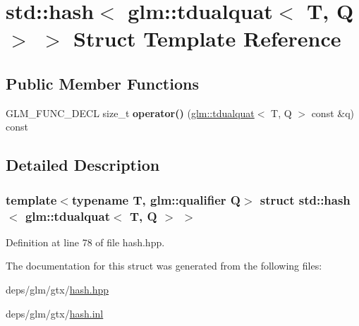 \hypertarget{structstd_1_1hash_3_01glm_1_1tdualquat_3_01T_00_01Q_01_4_01_4}{}\section{std\+:\+:hash$<$ glm\+:\+:tdualquat$<$ T, Q $>$ $>$ Struct Template Reference}
\label{structstd_1_1hash_3_01glm_1_1tdualquat_3_01T_00_01Q_01_4_01_4}
\subsection*{Public Member Functions}
\begin{DoxyCompactItemize}
\item 
\mbox{\label{structstd_1_1hash_3_01glm_1_1tdualquat_3_01T_00_01Q_01_4_01_4_a80f15815b3bbeb594040b62885ac8888}} 
G\+L\+M\+\_\+\+F\+U\+N\+C\+\_\+\+D\+E\+CL size\+\_\+t {\bfseries operator()} (\hyperlink{structglm_1_1tdualquat}{glm\+::tdualquat}$<$ T, Q $>$ const \&q) const
\end{DoxyCompactItemize}


\subsection{Detailed Description}
\subsubsection*{template$<$typename T, glm\+::qualifier Q$>$\newline
struct std\+::hash$<$ glm\+::tdualquat$<$ T, Q $>$ $>$}



Definition at line 78 of file hash.\+hpp.



The documentation for this struct was generated from the following files\+:\begin{DoxyCompactItemize}
\item 
deps/glm/gtx/\hyperlink{hash_8hpp}{hash.\+hpp}\item 
deps/glm/gtx/\hyperlink{hash_8inl}{hash.\+inl}\end{DoxyCompactItemize}
